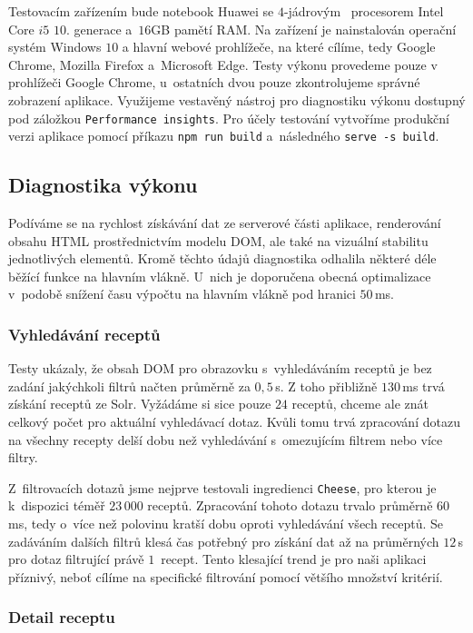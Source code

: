 Testovacím zařízením bude notebook Huawei se $4$-jádrovým ~procesorem Intel Core $i5$ $10$. generace a~$16$GB pamětí RAM. Na zařízení je nainstalován operační systém Windows $10$ a hlavní webové prohlížeče, na které cílíme, tedy Google Chrome, Mozilla Firefox a~Microsoft Edge. Testy výkonu provedeme pouze v prohlížeči Google Chrome, u~ostatních dvou pouze zkontrolujeme správné zobrazení aplikace. Využijeme vestavěný nástroj pro diagnostiku výkonu dostupný pod záložkou \texttt{Performance insights}. Pro účely testování vytvoříme produkční verzi aplikace pomocí příkazu \texttt{npm\,run\,build} a~následného \texttt{serve\,-s\,build}.

\subsection{Diagnostika výkonu}

Podíváme se na rychlost získávání dat ze serverové části aplikace, renderování obsahu HTML prostřednictvím modelu DOM, ale také na vizuální stabilitu jednotlivých elementů. Kromě těchto údajů diagnostika odhalila některé déle běžící funkce na hlavním vlákně. U~nich je doporučena obecná optimalizace v~podobě snížení času výpočtu na hlavním vlákně pod hranici $50\,$ms.

\subsubsection{Vyhledávání receptů}

Testy ukázaly, že obsah DOM pro obrazovku s~vyhledáváním receptů je bez zadání jakýchkoli filtrů načten průměrně za $0,5\,$s. Z toho přibližně $130\,$ms trvá získání receptů ze Solr. Vyžádáme si sice pouze $24$ receptů, chceme ale znát celkový počet pro aktuální vyhledávací dotaz. Kvůli tomu trvá zpracování dotazu na všechny recepty delší dobu než vyhledávání s~omezujícím filtrem nebo více filtry.

Z~filtrovacích dotazů jsme nejprve testovali ingredienci \texttt{Cheese}, pro kterou je k~dispozici téměř $23\,000$ receptů. Zpracování tohoto dotazu trvalo průměrně $60\,$ms, tedy o~více než polovinu kratší dobu oproti vyhledávání všech receptů. Se zadáváním dalších filtrů klesá čas potřebný pro získání dat až na průměrných $12\,$s pro dotaz filtrující právě $1$~recept. Tento klesající trend je pro naši aplikaci příznivý, neboť cílíme na specifické filtrování pomocí většího množství kritérií. 

\subsubsection{Detail receptu}

